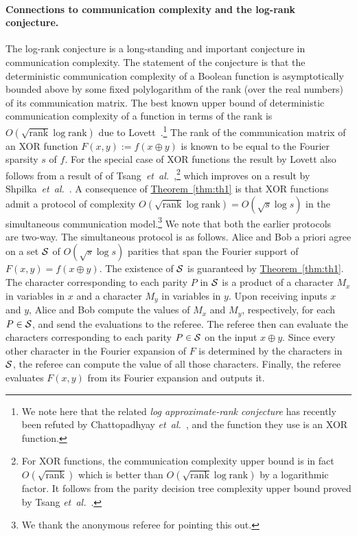 \documentclass{toc}
\newcommand{\etal}{{\it et~al.}}
\newcommand{\lref}[2][]{\hyperref[#2]{#1~\ref*{#2}}}
\begin{document}
\paragraph{Connections to communication complexity and the log-rank
conjecture.}  %
The log-rank conjecture is a long-standing and
important conjecture in communication complexity. The statement of the
conjecture is that the deterministic communication complexity of a
Boolean function is asymptotically bounded above by some fixed
polylogarithm of the rank (over the real numbers) of its communication
matrix. The best known upper bound of deterministic communication
complexity of a function in terms of the rank is $O(\sqrt{\mbox{rank}} \log \mbox{rank})$ due to Lovett~\cite{lovett}.\footnote{We note here that the related \emph{log approximate-rank conjecture} has
%
recently been refuted by
Chattopadhyay \etal~\cite{DBLP:journals/eccc/ChattopadhyayMS18}, and
the function
%
they use   %
is an XOR function.}
The rank of the communication matrix of an XOR 
function $F(x,y):=f(x \oplus y)$ is known to be equal to the Fourier sparsity $s$ of $f$. For the special case of XOR functions the result by Lovett also follows from
%
a result of  %
of Tsang~\etal~\cite{tsang},\footnote{For
XOR functions, the communication complexity upper bound is in fact $O(\sqrt{\mbox{rank}})$ which is better than $O(\sqrt{\mbox{rank}} \log \mbox{rank})$ by a logarithmic factor. It follows from the parity decision tree complexity upper bound proved by Tsang \etal~\cite{tsang}.}
which improves on
%
a result by   %
Shpilka~\etal~\cite{DBLP:conf/innovations/ShpilkaTV14}. A consequence of \lref[Theorem]{thm:th1} is that XOR functions admit a protocol of complexity $O(\sqrt{\mbox{rank}} \log \mbox{rank})=O(\sqrt{s} \log s)$ in the simultaneous communication model.\footnote{We thank the anonymous referee for pointing this out.} We note that both the earlier protocols~\cite{lovett, tsang} are two-way. The simultaneous protocol is as follows. Alice and Bob a priori agree on a set $\cal S$
of $O(\sqrt{s} \log s)$ parities that span the Fourier support
of $F(x,y)=f(x \oplus y)$. The existence of $\cal S$ is guaranteed by \lref[Theorem]{thm:th1}. The character corresponding to each
parity $P$ in $\cal S$ is a product of a character $M_x$ in variables in $x$ and a character $M_y$ in variables in $y$.
Upon receiving inputs $x$ and $y$, Alice and Bob compute the values of $M_x$ and $M_y$, respectively, %
for each $P \in \cal S$, and send the evaluations to the referee.
The referee then can evaluate the characters corresponding to each parity $P \in \cal S$ on the input $x \oplus y$. Since every other character
in the Fourier expansion of $F$ is determined by the characters in $\cal S$, the referee can compute the value of all those characters. Finally, the referee evaluates $F(x,y)$ from its Fourier expansion and outputs it.
\end{document}
